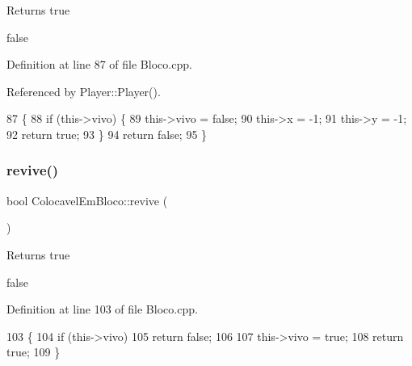\begin{DoxyReturn}{Returns}
true 

false 
\end{DoxyReturn}


Definition at line 87 of file Bloco.\+cpp.



Referenced by Player\+::\+Player().


\begin{DoxyCode}
87                             \{
88     \textcolor{keywordflow}{if} (this->vivo) \{
89         this->vivo = \textcolor{keyword}{false};
90         this->x = -1;
91         this->y = -1;
92         \textcolor{keywordflow}{return} \textcolor{keyword}{true};
93     \}
94     \textcolor{keywordflow}{return} \textcolor{keyword}{false};
95 \}
\end{DoxyCode}
\mbox{\label{class_colocavel_em_bloco_a82f12304bcb919f4fe3fc765d00a3d0f}} 
\subsubsection{\texorpdfstring{revive()}{revive()}}
{\footnotesize\ttfamily bool Colocavel\+Em\+Bloco\+::revive (\begin{DoxyParamCaption}{ }\end{DoxyParamCaption})}

\begin{DoxyReturn}{Returns}
true 

false 
\end{DoxyReturn}


Definition at line 103 of file Bloco.\+cpp.


\begin{DoxyCode}
103                               \{
104     \textcolor{keywordflow}{if} (this->vivo)
105         \textcolor{keywordflow}{return} \textcolor{keyword}{false};
106 
107     this->vivo = \textcolor{keyword}{true};
108     \textcolor{keywordflow}{return} \textcolor{keyword}{true};
109 \}
\end{DoxyCode}
\mbox{\label{class_colocavel_em_bloco_a1d45029183e2b8fe4790d44ca0fa3484}} 
